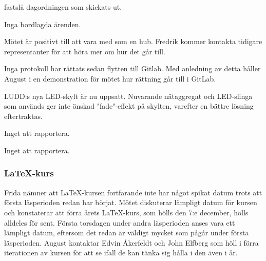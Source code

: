 \documentclass{protokoll}
\begin{document}
\newpage  


\begin{beslut}
     \att fastslå dagordningen som skickats ut.
\end{beslut}

Inga bordlagda ärenden.

Mötet är positivt till att vara med som en hub. Fredrik kommer kontakta tidigare representanter för att höra mer om hur det går till.

Inga protokoll har rättats sedan flytten till Gitlab. Med anledning av detta håller August i en demonstration för mötet hur rättning går till i GitLab. 

LUDD:s nya LED-skylt är nu uppsatt. Nuvarande nätaggregat och LED-slinga som används ger inte önskad "fade"-effekt på skylten, varefter en bättre lösning eftertraktas. %

Inget att rapportera. 

Inget att rapportera. 

\subsubsection{LaTeX-kurs}
Frida nämner att LaTeX-kursen fortfarande inte har något spikat datum trots att första läsperioden redan har börjat. Mötet diskuterar lämpligt datum för kursen och konstaterar att förra årets LaTeX-kurs, som hölls den 7:e december, hölls alldeles för sent. 
Första torsdagen under andra läsperioden anses vara ett lämpligt datum, eftersom det redan är väldigt mycket som pågår under första läsperioden. 
August kontaktar Edvin Åkerfeldt och John Elfberg som höll i förra iterationen av kursen för att se ifall de kan tänka sig hålla i den även i år. 
\end{document}
